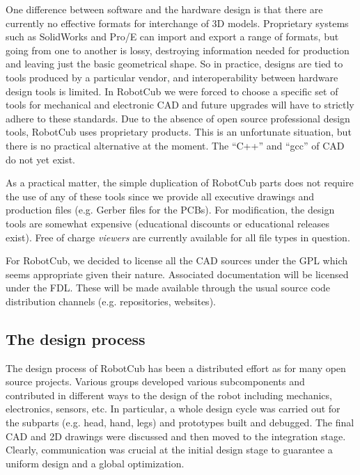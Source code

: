 One difference between software and the hardware design is that there are
currently no effective formats for interchange of 3D models.
%
Proprietary systems such as SolidWorks and Pro/E can import and export
a range of formats, but going from one to another is lossy, destroying
information needed for production and leaving just the basic geometrical
shape.
%
So in practice, designs are tied to tools produced by a particular
vendor, and interoperability
between hardware design tools is limited.
%
%
%
In RobotCub we were forced to choose a specific 
set of tools for mechanical and electronic CAD and future upgrades will have to strictly 
adhere to these standards. 
%
Due to the absence of open source professional design tools, RobotCub
uses proprietary products. 
%
This is an unfortunate situation, but there is no practical
alternative at the moment.  The ``C++'' and ``gcc'' of 
CAD do not yet exist.
%

As a practical matter, the simple duplication of RobotCub parts does not
require the use of any of these tools since we provide all executive drawings and 
production files (e.g. Gerber files for the PCBs).
%
%
%
For modification, the design tools are somewhat expensive
(educational discounts or educational releases exist).
Free of charge {\em viewers} are
currently available for all file types in question. 
%

For RobotCub, we decided to license all the CAD sources under the GPL
which seems appropriate given their nature.  Associated documentation
will be licensed under the FDL.  These will be made available through
the usual source code distribution channels (e.g. repositories,
websites).

\subsection{The design process}
The design process of RobotCub has been a distributed effort as for many open
source projects. Various groups developed various subcomponents and contributed in
different ways to the design of the robot including mechanics, electronics, sensors, 
etc. In particular, a whole design cycle was carried out for the subparts (e.g.
head, hand, legs) and prototypes built and debugged. The final CAD and 2D drawings 
were discussed and then moved to the integration stage. Clearly, communication
was crucial at the initial design stage to guarantee a uniform design and a
global optimization.

